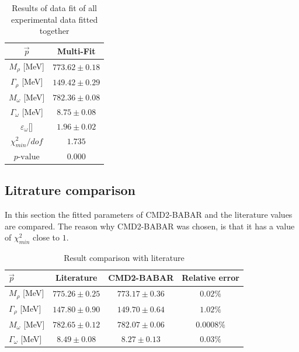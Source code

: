 \documentclass[a4paper]{article}
\begin{document}
\begin{table}[h!]
    \caption{Results of data fit of all experimental data fitted together\label{tabmulti}}
    \centering
    \begin{tabular}{|c|c|}
        \hline
        $\vec{p}$   & Multi-Fit\\
        \hline
        $M_{\rho}$       [MeV]       & $773.62	\pm 0.18$   \\
        $\Gamma_{\rho}$     [MeV]    & $149.42	\pm 0.29$  \\
        $M_{\omega}$         [MeV]   & $782.36	\pm 0.08$  \\
        $\Gamma_{\omega}$   [MeV]    & $8.75	\pm 0.08    $  \\
        $\varepsilon_{\omega}$[]  & $1.96	\pm 0.02    $  \\
        \hline \hline
        $\chi^2_{min}/dof$      & $1.735$\\
        $p\text{-value}$        & $0.000$\\
        \hline

    \end{tabular}
\end{table}

\subsection{Litrature comparison}
In this section the fitted parameters of CMD2-BABAR and the literature values\cite{particleref} are compared.
The reason why CMD2-BABAR was chosen, is that it has a value of $\chi^2_{min}$ close to $1$.
\begin{table}[ht!]
    \caption{Result comparison with literature\label{tabref}}
    \centering
    \begin{tabular}{|l|c|c|c|}
        \hline
        $\vec{p}$     & Literature    &   CMD2-BABAR      & Relative error \\
        \hline
        $M_{\rho}$   [MeV]           & $775.26	\pm 0.25$ & $773.17	\pm 0.36$ & $ 0.02 \%$\\
        $\Gamma_{\rho}$   [MeV]      & $147.80	\pm 0.90$  & $149.70	\pm 0.64$  & $ 1.02 \%$ \\
        $M_{\omega}$       [MeV]     & $782.65	\pm 0.12$  & $782.07	\pm 0.06$ & $ 0.0008\% $ \\
        $\Gamma_{\omega}$  [MeV]     & $8.49	\pm 0.08    $ & $8.27	\pm 0.13$  & $ 0.03 \%$\\
        \hline
    \end{tabular}
\end{table}
\end{document}

